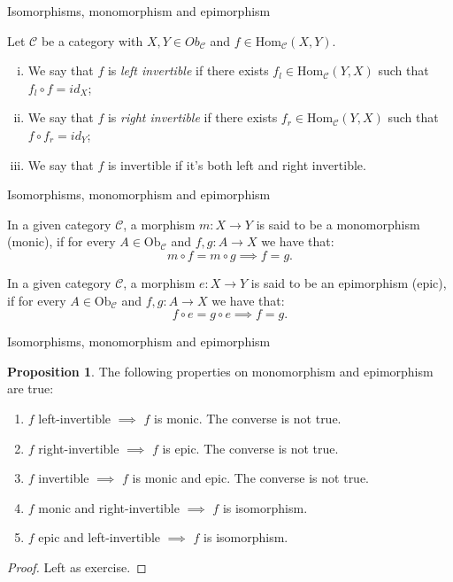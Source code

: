 \documentclass[aspectratio=169,xcolor=dvipsnames,10pt]{beamer}
\theoremstyle{definition}
\newtheorem{proposition}{Proposition}
\begin{document}
\begin{frame}[fragile]{Isomorphisms, monomorphism and epimorphism}
	\begin{definition}
        Let $\mathcal C$ be a category with $X,Y \in Ob_\mathcal C$ and $f \in \text{Hom}_\mathcal C (X,Y)$.
        \begin{enumerate}[(i)]
            \item We say that $f$ is \textit{left invertible} if there exists $f_l \in \text{Hom}_\mathcal C (Y,X)$ such
                  that $f_l \circ f = id_X$;
              \item We say that $f$ is \textit{right invertible} if there exists $f_r \in \text{Hom}_\mathcal C (Y,X)$ such
                  that $f \circ f_r = id_Y$;
            \item We say that $f$ is invertible if it's both left and right invertible.
        \end{enumerate}
	\end{definition}
\end{frame}

\begin{frame}[fragile]{Isomorphisms, monomorphism and epimorphism}
	\begin{definition}[Monomorphism]
        In a given category $\mathcal C$, a morphism $m:X\to Y$ is said to be a monomorphism (monic),
        if for every $A \in \text{Ob}_\mathcal C$ and $f,g:A \to X$ we have that:
        $$
        m\circ f = m\circ g \implies f = g.
        $$
	\end{definition}
	\begin{definition}[Epimorphism]
        In a given category $\mathcal C$, a morphism $e:X\to Y$ is said to be an epimorphism (epic),
        if for every $A \in \text{Ob}_\mathcal C$ and $f,g:A \to X$ we have that:
        $$
        f \circ e = g \circ e \implies f = g.
        $$
	\end{definition}
\end{frame}

\begin{frame}[fragile]{Isomorphisms, monomorphism and epimorphism}
    \begin{proposition}
        The following properties on monomorphism and epimorphism are true:
        \begin{enumerate}[1.]
            \item $f$ left-invertible $\implies$ $f$ is monic. The converse is not true.
            \item $f$ right-invertible $\implies$ $f$ is epic. The converse is not true.
            \item $f$ invertible $\implies$ $f$ is monic and epic. The converse is not true.
            \item $f$ monic and right-invertible $\implies $ $f$ is isomorphism.
            \item $f$ epic and left-invertible $\implies $ $f$ is isomorphism.
        \end{enumerate}
    \end{proposition}
    \begin{proof}
        Left as exercise.
    \end{proof}
\end{frame}
\end{document}
